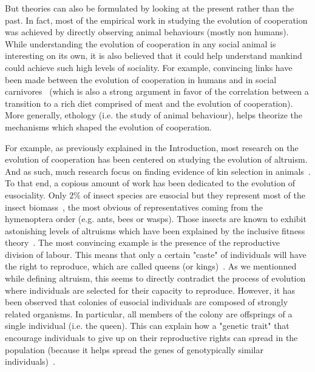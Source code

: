     But theories can also be formulated by looking at the present rather than the past. In fact, most of the empirical work in studying the evolution of cooperation was achieved by directly observing animal behaviours (mostly non humans). While understanding the evolution of cooperation in any social animal is interesting on its own, it is also believed that it could help understand mankind could achieve such high levels of sociality. For example, convincing links have been made between the evolution of cooperation in humans and in social carnivores~\cite{Schaller1968, Smith2012} (which is also a strong argument in favor of the correlation between a transition to a rich diet comprised of meat and the evolution of cooperation). More generally, ethology (i.e. the study of animal behaviour), helps theorize the mechanisms which shaped the evolution of cooperation.

    For example, as previously explained in the Introduction, most research on the evolution of cooperation has been centered on studying the evolution of altruism. And as such, much research focus on finding evidence of kin selection in animals~\cite{Bourke2014}. To that end, a copious amount of work has been dedicated to the evolution of eusociality. Only $2\%$ of insect species are eusocial but they represent most of the insect biomass~\cite{Wilson2008}, the most obvious of representatives coming from the hymenoptera order (e.g. ants, bees or wasps). Those insects are known to exhibit astonishing levels of altruisms which have been explained by the inclusive fitness theory~\cite{Bourke2011, Wilson2008}. The most convincing example is the presence of the reproductive division of labour. This means that only a certain "caste" of individuals will have the right to reproduce, which are called queens (or kings)~\cite{Wilson1990}. As we mentionned while defining altruism, this seems to directly contradict the process of evolution where individuals are selected for their capacity to reproduce. However, it has been observed that colonies of eusocial individuals are composed of strongly related organisms. In particular, all members of the colony are offsprings of a single individual (i.e. the queen). This can explain how a "genetic trait" that encourage individuals to give up on their reproductive rights can spread in the population (because it helps spread the genes of genotypically similar individuals)~\cite{Queller1998}.


